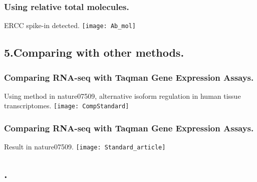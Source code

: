 \begin{frame}[c,fragile]
	\frametitle{ Using relative total molecules. }
	\begin{block}{ ERCC spike-in detected. }
		\texttt{[image: Ab\_mol]}
	\end{block}
\end{frame}

\subsection{5.Comparing with other methods.}
\begin{frame}[c,fragile]
	\frametitle{ Comparing RNA-seq with Taqman Gene Expression Assays. }
	\begin{block}{ Using method in nature07509, alternative isoform regulation in human tissue transcriptomes. }
		\texttt{[image: CompStandard]}
	\end{block}
\end{frame}

\begin{frame}[c,fragile]
	\frametitle{ Comparing RNA-seq with Taqman Gene Expression Assays. }
	\begin{block}{ Result in nature07509. }
		\texttt{[image: Standard\_article]}
	\end{block}
\end{frame}

\subsection{.}
